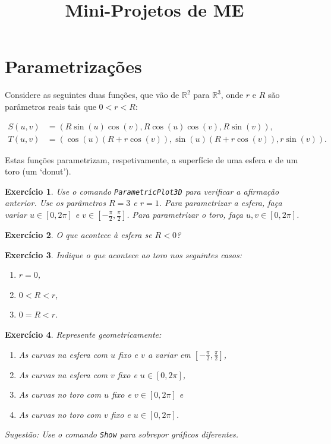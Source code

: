 \documentclass{article}
\title{Mini-Projetos de ME}
\author{}
\date{}
\newtheorem{ex}{Exercício}
\newcommand{\R}{\mathbb{R}}
\begin{document}
\section{Parametrizações}

Considere as seguintes duas funções, que vão de $\R^2$ para $\R^3$, onde $r$ e $R$ são parâmetros reais tais que $0 < r < R$:

\begin{align*}
S(u,v) &= (R \sin(u) \cos(v), R \cos(u) \cos(v), R \sin(v)),\\
T(u,v) &= (\cos(u) (R + r \cos(v)), \sin(u) (R + r \cos(v)), r \sin(v)).
\end{align*}

Estas funções parametrizam, respetivamente, a superfície de uma esfera e de um toro (um `donut').

\begin{ex}
Use o comando \texttt{ParametricPlot3D} para verificar a afirmação anterior. Use os parâmetros $R = 3$ e $r = 1$. Para parametrizar a esfera, faça variar $u \in [0,2\pi]$ e $v \in [-\frac\pi2, \frac\pi2]$. Para parametrizar o toro, faça $u, v \in [0, 2\pi]$.
\end{ex}

\begin{ex}
O que acontece à esfera se $R < 0$?
\end{ex}

\begin{ex}
Indique o que acontece ao toro nos seguintes casos:
\begin{enumerate}
\item $r = 0$,
\item $0 < R < r$,
\item $0 = R < r$.
\end{enumerate}
\end{ex}

\begin{ex}
Represente geometricamente:
\begin{enumerate}
\item As curvas na esfera com $u$ fixo e $v$ a variar em $[-\frac\pi2,\frac\pi2]$,
\item As curvas na esfera com $v$ fixo e $u \in [0,2\pi]$,
\item As curvas no toro com $u$ fixo e $v \in [0,2\pi]$ e
\item As curvas no toro com $v$ fixo e $u \in [0,2\pi]$.
\end{enumerate}

Sugestão: Use o comando \texttt{Show} para sobrepor gráficos diferentes.
\end{ex}
\end{document}

